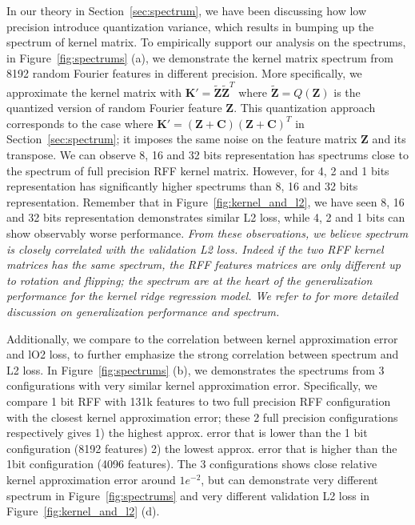 In our theory in Section~\ref{sec:spectrum}, we have been discussing how low precision introduce quantization variance, which results in bumping up the spectrum of kernel matrix. To empirically support our analysis on the spectrums, in Figure~\ref{fig:spectrums} (a), we demonstrate the kernel matrix spectrum from 8192 random Fourier features in different precision. 
More specifically, we approximate the kernel matrix with $\bm{K}'=\tilde{\bm{Z}}\tilde{\bm{Z}}^T$ where $\tilde{\bm{Z}}=Q(\bm{Z})$ is the quantized version of random Fourier feature $\bm{Z}$. This quantization approach corresponds to the case where $\bm{K}'=(\bm{Z} + \bm{C})(\bm{Z} + \bm{C})^T$ in Section~\ref{sec:spectrum}; it imposes the same noise on the feature matrix $\bm{Z}$ and its transpose.
We can observe 8, 16 and 32 bits representation has spectrums close to the spectrum of full precision RFF kernel matrix. However, for 4, 2 and 1 bits representation has significantly higher spectrums than 8, 16 and 32 bits representation. Remember that in Figure~\ref{fig:kernel_and_l2}, we have seen 8, 16 and 32 bits representation demonstrates similar L2 loss, while 4, 2 and 1 bits can show observably worse performance. \emph{From these observations, we believe spectrum is closely correlated with the validation L2 loss. Indeed if the two RFF kernel matrices has the same spectrum, the RFF features matrices are only different up to rotation and flipping; the spectrum are at the heart of the generalization performance for the kernel ridge regression model. We refer to for more detailed discussion on generalization performance and spectrum.} 

Additionally, we compare to the correlation between kernel approximation error and lO2 loss, to further emphasize the strong correlation between spectrum and L2 loss. In Figure~\ref{fig:spectrums} (b), we demonstrates the spectrums from 3 configurations with very similar kernel approximation error. Specifically, we compare 1 bit RFF with 131k features to two full precision RFF configuration with the closest kernel approximation error; these 2 full precision configurations respectively gives 1) the highest approx. error that is lower than the 1 bit configuration (8192 features) 2) the lowest approx. error that is higher than the 1bit configuration (4096 features). The 3 configurations shows close relative kernel approximation error around $1e^{-2}$, but can demonstrate very different spectrum in Figure~\ref{fig:spectrums} and very different validation L2 loss in Figure~\ref{fig:kernel_and_l2} (d).

